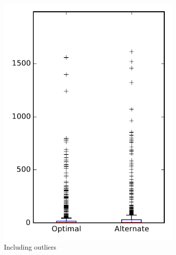 
\begin{figure}
    \centering
    \begin{subfigure}{.4\textwidth}
        \centering
        \includegraphics[height=0.4\textheight]{figures/combo/flt_rq2_overview}
        \caption{Including outliers}\label{fig:combo:flt:rq2:overview_outlier}
    \end{subfigure}%
    \begin{subfigure}{.4\textwidth}
        \centering

\end{subfigure}
\end{figure}
